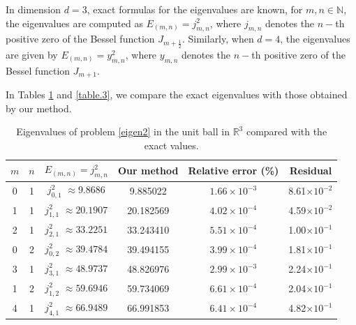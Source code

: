 \documentclass[reprint,superscriptaddress,aps,prl]{revtex4-2}
\newcommand{\R}{\mathbb{R}}
\newcommand{\N}{\mathbb{N}}
\begin{document}
%
%

 
In dimension $d=3$, exact formulas for the eigenvalues are known, for $m,n\in \N$, the eigenvalues are computed as $E_{(m,n)}=j_{m,n}^2$, where $j_{m,n}$ denotes the $n-$th positive zero of the Bessel function $J_{m+\frac12}$. Similarly, when $d=4$, the eigenvalues are given by $E_{(m,n)}=y_{m,n}^2$, where $y_{m,n}$ denotes the $n-$th positive zero of the Bessel function $J_{m+1}$.

In Tables \ref{table.2} and \ref{table.3}, we compare the exact eigenvalues with those obtained by our method.

\normalcolor
\begin{table}[h!]
\centering

\begin{tabular}{cc|c|c|c|c}
$m$ & $n$ & $E_{(m,n)} = j_{m,n}^2$ & Our method & Relative error (\%) & Residual \\  
\hline
0 & 1 & $j_{0,1}^2$   $\approx 9.8686$ & 9.885022 & $1.66\times 10^{-3}$& 8.61$\times 10^{-2}$ \\
1 & 1 & $j_{1,1}^2$   $\approx 20.1907$ & 20.182569 & $4.02\times 10^{-4}$ & 4.59$\times 10^{-2}$\\
2 & 1 & $j_{2,1}^2$   $\approx 33.2251$ & 33.243410 & $5.51\times 10^{-4}$& 1.00$\times 10^{-1}$\\
0 & 2 & $j_{0,2}^2$   $\approx 39.4784$  & 39.494155  & $3.99\times10^{-4} $& 1.81$\times 10^{-1}$ \\
3 & 1 & $j_{3,1}^2$   $\approx 48.9737$  & 48.826976  & $2.99\times 10^{-3}$& 2.24$\times 10^{-1}$ \\
1 & 2 & $j_{1,2}^2$   $\approx 59.6946$  & 59.734069   & $6.61\times 10^{-4}$ & 2.04$\times 10^{-1}$ \\
4 & 1 & $j_{4,1}^2$   $\approx 66.9489$  & 66.991853  & $6.41\times 10^{-4}$ & 4.82$\times 10^{-1}$ 
\end{tabular}
\caption{Eigenvalues of problem \eqref{eigen2} in the unit ball in $\R^3$ compared with the exact values. }
\label{table.2}
 
\end{table}
 
\end{document}
